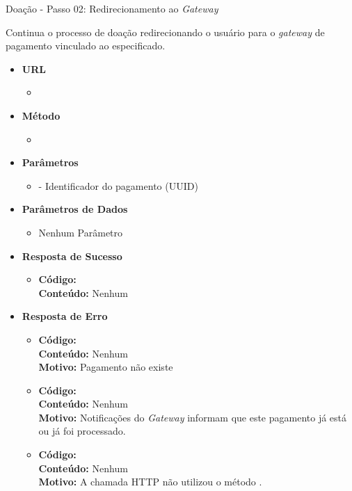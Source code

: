 \begin{caixa}{Doação - Passo 02: Redirecionamento ao \emph{Gateway}}{}

Continua o processo de doação redirecionando o usuário para o \emph{gateway} de pagamento vinculado ao  especificado.

\begin{itemize}
\item \textbf{URL}
	\begin{itemize}
		\item {}
	\end{itemize}

\item \textbf{Método}
	\begin{itemize}
		\item {}
	\end{itemize}

\item \textbf{Parâmetros}
	\begin{itemize}
		\item {} - Identificador do pagamento (UUID)
	\end{itemize}

\item \textbf{Parâmetros de Dados}
	\begin{itemize}
        \item Nenhum Parâmetro
	\end{itemize}

\item \textbf{Resposta de Sucesso}
	\begin{itemize}
		\item \textbf{Código:}  \\ \textbf{Conteúdo:} Nenhum
	\end{itemize}

\item \textbf{Resposta de Erro}
	\begin{itemize}
		\item \textbf{Código:}  \\ \textbf{Conteúdo:} Nenhum \\ \textbf{Motivo:} Pagamento não existe
        \item \textbf{Código:}  \\ \textbf{Conteúdo:} Nenhum \\ \textbf{Motivo:} Notificações do \emph{Gateway} informam que este pagamento já está ou já foi processado.
        \item \textbf{Código:}  \\ \textbf{Conteúdo:} Nenhum \\ \textbf{Motivo:} A chamada HTTP não utilizou o método .
	\end{itemize}

\end{itemize}
\end{caixa}

